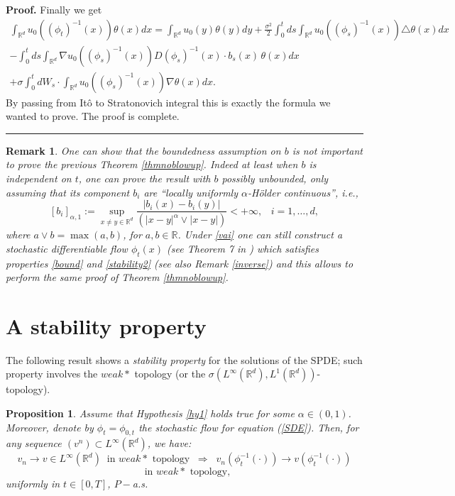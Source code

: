 \documentclass{article}
\newtheorem{proposition}[theorem]{Proposition}
\newtheorem{remark}[theorem]{Remark}
\newenvironment{proof}[1][Proof]{\noindent\textbf{#1.} }{\ \rule{0.5em}{0.5em}}
\begin{document}
\begin{proof}
Finally we get
\[
\begin{split}
\int_{{\mathbb{R}}^{d}}u_{0}( ( \phi_{t})^{-1}(x) )\theta(x)dx =\int%
_{{\mathbb{R}}^{d}}u_{ 0}(y )\theta(y)dy+
\frac{\sigma^2}{2}\int_{0}^{t}ds
\int_{{\mathbb{R} }^{d}}u_{0}(( \phi_{s})^{-1}(x) ) \triangle\theta(x) dx\\
- \int_{0}^{t}ds\int_{{\mathbb{R}}^{d}} \nabla u_{0}((\phi_{s})^{-1}(x) ) D
(\phi_{s})^{-1}(x) \cdot b_{s} (x) \, \theta(x) dx\\
+\sigma\int_{0}^{t}dW_{s}\cdot\int_{{\mathbb{R}}^{d}}u_{0}(( \phi_{s}%
)^{-1}(x))\nabla\theta(x)dx.
\end{split}
\]
By passing from It\^o to Stratonovich integral this is exactly the formula we
wanted to prove. The proof is complete.
\end{proof}

\begin{remark}
\emph{One can show that the boundedness assumption  on $b$ is not important to
prove the previous Theorem \ref{thmnoblowup}. Indeed at least when $b $ is
independent on $t$, one can prove the result with $b$ possibly unbounded, only
assuming that its component $b_{i}$ are ``locally uniformly $\alpha
$-H\"{o}lder continuous'', i.e.,
\begin{equation}
\label{vai}[ b_{i}]_{\alpha,1}:=\sup_{x\neq y\in\mathbb{R}^{d}}\frac{|b_{i}
(x)-b_{i}(y)|}{(|x-y|^{\alpha}\vee|x-y|)}<+\infty, \;\;\; i=1, \ldots, d,
\end{equation}
where $a\vee b=\max(a,b)$, for $a,b\in\mathbb{R}$. Under \eqref{vai}  one can
still construct a stochastic differentiable  flow $\phi_{t}(x)$  (see Theorem
7 in \cite{FGP3}) which satisfies  properties \eqref{bound} and
\eqref{stability2} (see also Remark  \ref{inverse}) and this  allows  to
perform the same proof of Theorem  \ref{thmnoblowup}. }
\end{remark}

\section{A stability property}

The following result shows a  \textit{stability property} for the
solutions of the SPDE; such property involves  the  $weak*$ topology (or the
$\sigma(L^{\infty}(\mathbb{R}^{d}),  L^{1}(\mathbb{R}^{d}))$-topology).

\begin{proposition}
\label{stab} Assume that Hypothesis \ref{hy1} holds true for some  $\alpha
\in(0,1)$. Moreover, denote by $\phi_{t} = \phi_{0,t} $  the stochastic flow
for equation (\ref{SDE}).  Then, for any sequence $(v^{n}) \subset L^{\infty
}(\mathbb{R}^{d})$, we have:
\[
v_{n} \to v \in L^{\infty}(\mathbb{R}^{d})\;\; \text{in $weak*$ topology}
\;\;  \Longrightarrow\;\; v_{n} (\phi_{t}^{-1}(\cdot))  \to v (\phi_{t}%
^{-1}(\cdot))
\]%
\[
\;\; \text{in $weak*$ topology,}
\]
uniformly in $t \in[0,T]$, ${P}-$a.s.
\end{proposition}
\end{document}
